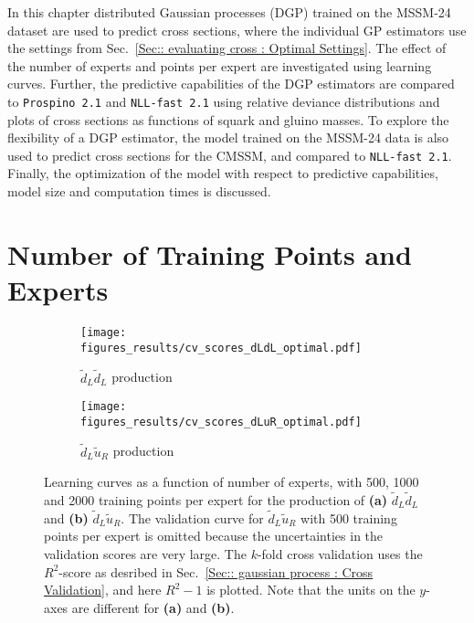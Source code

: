 \documentclass[twoside,english]{uiofysmaster}
\begin{document}
{{In this chapter distributed Gaussian processes (DGP) trained on the MSSM-24 dataset are used to predict cross sections, where the individual GP estimators use the settings from Sec.~\ref{Sec:: evaluating cross : Optimal Settings}. The effect of the number of experts and points per expert are investigated using learning curves. Further, the predictive capabilities of the DGP estimators are compared to \verb|Prospino 2.1| and \verb|NLL-fast 2.1| using relative deviance distributions and plots of cross sections as functions of squark and gluino masses. To explore the flexibility of a DGP estimator, the model trained on the MSSM-24 data is also used to predict cross sections for the CMSSM, and compared to \verb|NLL-fast 2.1|. Finally, the optimization of the model with respect to predictive capabilities, model size and computation times is discussed.

\section{Number of Training Points and Experts}

\begin{figure}
    \centering
    \begin{subfigure}[b]{0.9\textwidth}
        \texttt{[image: figures\_results/cv\_scores\_dLdL\_optimal.pdf]}
        \caption{$\widetilde{d}_L \widetilde{d}_L$ production}
        \label{Fig:: results : Learning curves dLdL}
    \end{subfigure}
    \begin{subfigure}[b]{0.9\textwidth}
        \texttt{[image: figures\_results/cv\_scores\_dLuR\_optimal.pdf]}
        \caption{$\widetilde{d}_L \widetilde{u}_R$ production}
        \label{Fig :: results : Learning curves dLuL}
    \end{subfigure}
    \caption[Learning curves for the optimal GP estimator]{Learning curves as a function of number of experts, with 500, 1000 and 2000 training points per expert for the production of \textbf{(a)} $\widetilde{d}_L \widetilde{d}_L$ and \textbf{(b)} $\widetilde{d}_L\widetilde{u}_R$. The validation curve for $\widetilde{d}_L \widetilde{u}_R$ with 500 training points per expert is omitted because the uncertainties in the validation scores are very large. The $k$-fold cross validation uses the $R^2$-score as desribed in Sec.~\ref{Sec:: gaussian process : Cross Validation}, and here $R^2-1$ is plotted. Note that the units on the $y$-axes are different for \textbf{(a)} and \textbf{(b)}.}
\label{Fig:: results : Learning curves}
\end{figure}

}}
\end{document}
